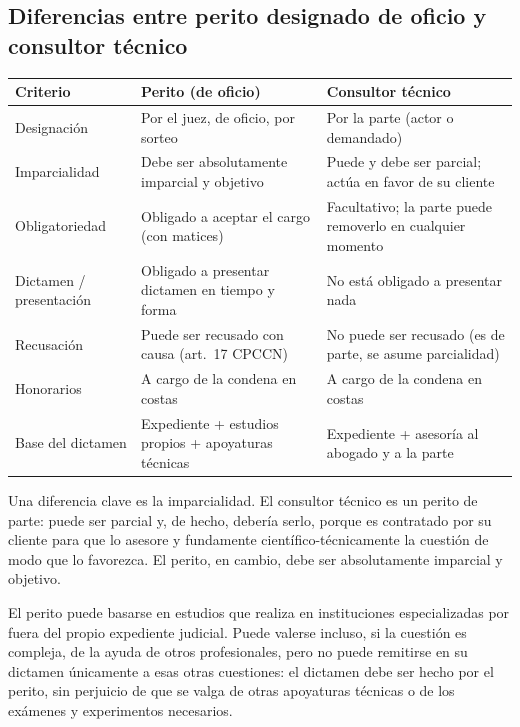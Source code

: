 \documentclass[12pt,oneside]{book}
\begin{document}
\subsection{Diferencias entre perito designado de oficio y consultor técnico}

\begin{table}[H]
\centering
\small
\begin{tabularx}{\textwidth}{
    >{\raggedright\arraybackslash}p{}
    >{\raggedright\arraybackslash}X
    >{\raggedright\arraybackslash}X
}
\toprule
\textbf{Criterio} & \textbf{Perito (de oficio)} & \textbf{Consultor técnico} \\
\midrule
Designación & Por el juez, de oficio, por sorteo & Por la parte (actor o demandado) \\
Imparcialidad & Debe ser absolutamente imparcial y objetivo & Puede y debe ser parcial; actúa en favor de su cliente \\
Obligatoriedad & Obligado a aceptar el cargo (con matices) & Facultativo; la parte puede removerlo en cualquier momento \\
Dictamen / presentación & Obligado a presentar dictamen en tiempo y forma & No está obligado a presentar nada \\
Recusación & Puede ser recusado con causa (art.\ 17 CPCCN) & No puede ser recusado (es de parte, se asume parcialidad) \\
Honorarios & A cargo de la condena en costas & A cargo de la condena en costas \\
Base del dictamen & Expediente + estudios propios + apoyaturas técnicas & Expediente + asesoría al abogado y a la parte \\
\bottomrule
\end{tabularx}
\end{table}

Una diferencia clave es la imparcialidad. El consultor técnico es un perito de parte: puede ser parcial y, de hecho, debería serlo, porque es contratado por su cliente para que lo asesore y fundamente científico-técnicamente la cuestión de modo que lo favorezca. El perito, en cambio, debe ser absolutamente imparcial y objetivo.

El perito puede basarse en estudios que realiza en instituciones especializadas por fuera del propio expediente judicial. Puede valerse incluso, si la cuestión es compleja, de la ayuda de otros profesionales, pero no puede remitirse en su dictamen únicamente a esas otras cuestiones: el dictamen debe ser hecho por el perito, sin perjuicio de que se valga de otras apoyaturas técnicas o de los exámenes y experimentos necesarios.
\end{document}
